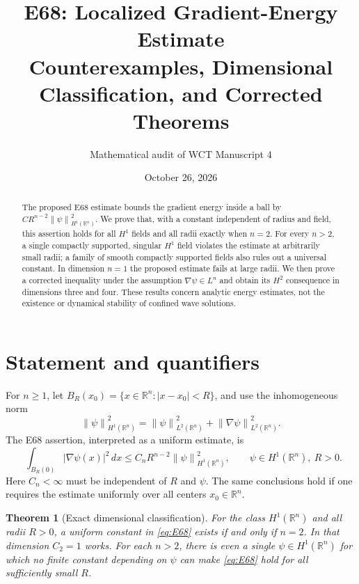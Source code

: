 \documentclass[11pt]{article}
\title{E68: Localized Gradient-Energy Estimate\\
\large Counterexamples, Dimensional Classification, and Corrected Theorems}
\author{Mathematical audit of WCT Manuscript 4}
\date{October 26, 2026}
\newtheorem{theorem}{Theorem}[section]
\newcommand{\Rn}{\mathbb{R}^{n}}
\newcommand{\norm}[1]{\left\lVert #1\right\rVert}
\begin{document}
\maketitle

\begin{abstract}
The proposed E68 estimate bounds the gradient energy inside a ball by
$CR^{n-2}\norm{\psi}_{H^1(\Rn)}^2$. We prove that, with a constant
independent of radius and field, this assertion holds for all $H^1$ fields
and all radii exactly when $n=2$. For every $n>2$, a single compactly
supported, singular $H^1$ field violates the estimate at arbitrarily small
radii; a family of smooth compactly supported fields also rules out a
universal constant. In dimension $n=1$ the proposed estimate fails at
large radii. We then prove a corrected inequality under the assumption
$\nabla\psi\in L^n$ and obtain its $H^2$ consequence in dimensions three
and four. These results concern analytic energy estimates, not the
existence or dynamical stability of confined wave solutions.
\end{abstract}

\section{Statement and quantifiers}

For $n\geq1$, let $B_R(x_0)=\{x\in\Rn:|x-x_0|<R\}$, and use the
inhomogeneous norm
\[
\norm{\psi}_{H^1(\Rn)}^2
=\norm{\psi}_{L^2(\Rn)}^2+\norm{\nabla\psi}_{L^2(\Rn)}^2.
\]
The E68 assertion, interpreted as a uniform estimate, is
\begin{equation}\label{eq:E68}
\boxed{\qquad
\int_{B_R(0)}|\nabla\psi(x)|^2\,dx
\leq C_n R^{n-2}\norm{\psi}_{H^1(\Rn)}^2,
\qquad \psi\in H^1(\Rn),\ R>0.
\qquad}
\tag{E68}
\end{equation}
Here $C_n<\infty$ must be independent of $R$ and $\psi$. The same
conclusions hold if one requires the estimate uniformly over all centers
$x_0\in\Rn$.

\begin{theorem}[Exact dimensional classification]\label{thm:classification}
For the class $H^1(\Rn)$ and all radii $R>0$, a uniform constant in
\eqref{eq:E68} exists if and only if $n=2$. In that dimension $C_2=1$
works. For each $n>2$, there is even a single
$\psi\in H^1(\Rn)$ for which no finite constant depending on $\psi$
can make \eqref{eq:E68} hold for all sufficiently small $R$.
\end{theorem}
\end{document}
